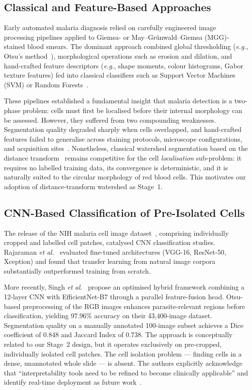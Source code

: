 \documentclass[10pt,twocolumn]{article}
\newcommand{\eg}{\textit{e.g.}}
\newcommand{\etal}{\textit{et al.}}
\begin{document}
\subsection{Classical and Feature-Based Approaches}
\label{ssec:classical}

Early automated malaria diagnosis relied on carefully engineered image
processing pipelines applied to Giemsa- or May--Gr\"{u}nwald--Giemsa
(MGG)-stained blood smears. The dominant approach combined global
thresholding (\eg, Otsu's method~\cite{otsu1979}), morphological
operations such as erosion and dilation, and hand-crafted feature
descriptors (\eg, shape moments, colour histograms, Gabor texture
features) fed into classical classifiers such as Support Vector Machines
(SVM) or Random Forests~\cite{poostchi2018}.

These pipelines established a fundamental insight that malaria detection
is a two-phase problem: cells must first be localised before their internal
morphology can be assessed. However, they suffered from two compounding
weaknesses. Segmentation quality degraded sharply when cells overlapped,
and hand-crafted features failed to generalise across staining protocols,
microscope configurations, and acquisition sites~\cite{poostchi2018,delgado2020}.
Nonetheless, classical watershed segmentation based on the distance
transform~\cite{beucher1992} remains competitive for the cell
\emph{localisation} sub-problem: it requires no labelled training data,
its convergence is deterministic, and it is naturally suited to the circular
morphology of red blood cells. This motivates our adoption of
distance-transform watershed as Stage~1.

\subsection{CNN-Based Classification of Pre-Isolated Cells}
\label{ssec:cnn_class}

The release of the NIH malaria cell image dataset~\cite{rajaraman2019},
comprising individually cropped and labelled cell patches, catalysed CNN
classification studies. Rajaraman \etal~\cite{rajaraman2019} evaluated
fine-tuned architectures (VGG-16, ResNet-50, Xception) and found that
transfer learning from natural image corpora substantially outperformed
training from scratch.

More recently, Singh \etal~\cite{singh2025} propose an optimised hybrid
framework combining a 12-layer CNN with EfficientNet-B7 through a parallel
feature-fusion head. Otsu-based preprocessing of the RGB images enhances
parasite-relevant regions before classification, yielding 97.96\% accuracy
on their 43,400-image dataset. Segmentation quality on a manually annotated
100-image subset achieves a Dice coefficient of 0.848 and Jaccard Index
of 0.738. The approach is conceptually related to our Stage~2 design, but
it operates exclusively on pre-cropped, individually isolated cell patches.
The cell isolation problem --- finding cells in a dense, unannotated whole
slide --- is absent. The authors explicitly acknowledge that
``interpretability tools need to be refined to become clinically
applicable'' and identify real-time deployment as future work~\cite{singh2025}.
\end{document}

